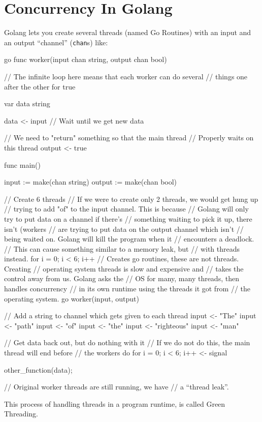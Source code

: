 \section{Concurrency In Golang}\label{sec:concurrency_in_golang}

Golang lets you create several threads (named Go Routines) with an input and an output ``channel'' (\texttt{chan}s) like:
\begin{code}{go}
    func worker(input chan string, output chan bool) {
        // The infinite loop here means that each worker can do several
        // things one after the other
        for true {
            var data string

            data <- input // Wait until we get new data

            // We need to "return" something so that the main thread
            // Properly waits on this thread
            output <- true
        }
    }

    func main() {
        input := make(chan string)
        output := make(chan bool)

        // Create 6 threads
        // If we were to create only 2 threads, we would get hung up
        // trying to add "of" to the input channel. This is because
        // Golang will only try to put data on a channel if there's
        // something waiting to pick it up, there isn't (workers
        // are trying to put data on the output channel which isn't
        // being waited on. Golang will kill the program when it
        // encounters a deadlock.
        // This can cause something similar to a memory leak, but
        // with threads instead.
        for i = 0; i < 6; i++ {
            // Creates go routines, these are not threads. Creating
            // operating system threads is slow and expensive and
            // takes the control away from us. Golang asks the
            // OS for many, many threads, then handles concurrency
            // in its own runtime using the threads it got from
            // the operating system.
            go worker(input, output)
        }

        // Add a string to channel which gets given to each thread
        input <- "The"
        input <- "path"
        input <- "of"
        input <- "the"
        input <- "righteous"
        input <- "man"

        // Get data back out, but do nothing with it
        // If we do not do this, the main thread will end before
        // the workers do
        for i = 0; i < 6; i++ {
            <- signal
        }

        other_function(data);

        // Original worker threads are still running, we have
        // a ``thread leak''.
    }
\end{code}
This process of handling threads in a program runtime, is called Green Threading.
